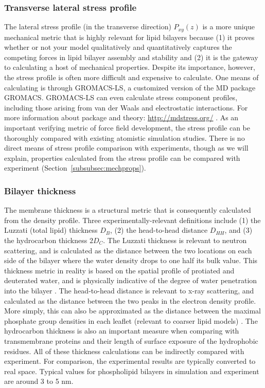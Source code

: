 \documentclass[9pt,bestpractices]{livecoms}
\begin{document}
\subsubsection{Transverse lateral stress profile}
\label{subsubsec:latstress}
The lateral stress profile (in the transverse direction) $P_{xy}(z)$ is a more unique mechanical metric that is highly relevant for lipid bilayers because (1) it proves whether or not your model qualitatively and quantitatively captures the competing forces in lipid bilayer assembly and stability and (2) it is the gateway to calculating a host of mechanical properties.
Despite its importance, however, the stress profile is often more difficult and expensive to calculate.
One means of calculating is through GROMACS-LS, a customized version of the MD package GROMACS.
GROMACS-LS can even calculate stress component profiles, including those arising from van der Waals and electrostatic interactions.
For more information about package and theory: \url{http://mdstress.org/} \cite{Ollila2009}.
As an important verifying metric of force field development, the stress profile can be thoroughly compared with existing atomistic simulation studies.
There is no direct means of stress profile comparison with experiments, though as we will explain, properties calculated from the stress profile can be compared with experiment (Section~\ref{subsubsec:mechprops}).

\subsubsection{Bilayer thickness}
\label{subsubsec:thickness}
The membrane thickness is a structural metric that is consequently calculated from the density profile.
Three experimentally-relevant definitions include (1) the Luzzati (total lipid) thickness $D_B$, (2) the head-to-head distance $D_{HH}$, and (3) the hydrocarbon thickness $2D_C$.
The Luzzati thickness is relevant to neutron scattering, and is calculated as the distance between the two locations on each side of the bilayer where the water density drops to one half its bulk value.
This thickness metric in reality is based on the spatial profile of protiated and deuterated water, and is physically indicative of the degree of water penetration into the bilayer \cite{Poger2016}.
The head-to-head distance is relevant to x-ray scattering, and calculated as the distance between the two peaks in the electron density profile.
More simply, this can also be approximated as the distance between the maximal phosphate group densities in each leaflet (relevant to coarser lipid models) \cite{Poger2016}.
The hydrocarbon thickness is also an important measure when comparing with transmembrane proteins and their length of surface exposure of the hydrophobic residues.
All of these thickness calculations can be indirectly compared with experiment.
For comparison, the experimental results are typically converted to real space.
Typical values for phospholipid bilayers in simulation and experiment are around 3 to 5 nm.
\end{document}
